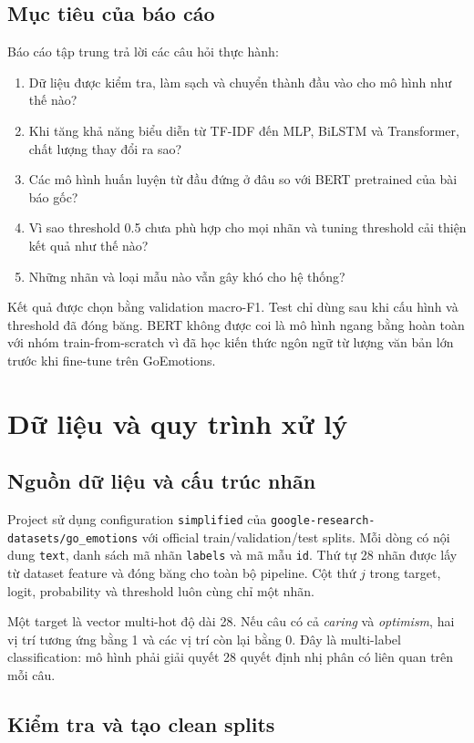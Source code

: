 \documentclass[12pt,a4paper]{article}
\begin{document}
\subsection{Mục tiêu của báo cáo}

Báo cáo tập trung trả lời các câu hỏi thực hành:
\begin{enumerate}
\item Dữ liệu được kiểm tra, làm sạch và chuyển thành đầu vào cho mô hình như thế nào?
\item Khi tăng khả năng biểu diễn từ TF-IDF đến MLP, BiLSTM và Transformer, chất lượng thay đổi ra sao?
\item Các mô hình huấn luyện từ đầu đứng ở đâu so với BERT pretrained của bài báo gốc?
\item Vì sao threshold 0.5 chưa phù hợp cho mọi nhãn và tuning threshold cải thiện kết quả như thế nào?
\item Những nhãn và loại mẫu nào vẫn gây khó cho hệ thống?
\end{enumerate}

Kết quả được chọn bằng validation macro-F1. Test chỉ dùng sau khi cấu hình và threshold đã đóng băng. BERT không được coi là mô hình ngang bằng hoàn toàn với nhóm train-from-scratch vì đã học kiến thức ngôn ngữ từ lượng văn bản lớn trước khi fine-tune trên GoEmotions.

\section{Dữ liệu và quy trình xử lý}
\subsection{Nguồn dữ liệu và cấu trúc nhãn}

Project sử dụng configuration \texttt{simplified} của \texttt{google-research-datasets/go\_emotions} với official train/validation/test splits. Mỗi dòng có nội dung \texttt{text}, danh sách mã nhãn \texttt{labels} và mã mẫu \texttt{id}. Thứ tự 28 nhãn được lấy từ dataset feature và đóng băng cho toàn bộ pipeline. Cột thứ $j$ trong target, logit, probability và threshold luôn cùng chỉ một nhãn.

Một target là vector multi-hot độ dài 28. Nếu câu có cả \textit{caring} và \textit{optimism}, hai vị trí tương ứng bằng 1 và các vị trí còn lại bằng 0. Đây là multi-label classification: mô hình phải giải quyết 28 quyết định nhị phân có liên quan trên mỗi câu.

\subsection{Kiểm tra và tạo clean splits}
\end{document}
